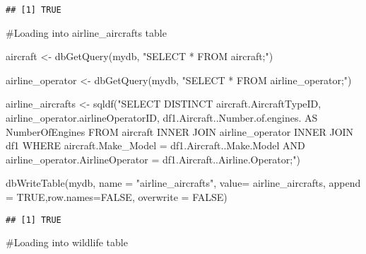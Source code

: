 \documentclass[
]{article}
\newenvironment{Shaded}{\begin{snugshade}}{\end{snugshade}}
\newcommand{\AttributeTok}[1]{\textcolor[rgb]{0.77,0.63,0.00}{#1}}
\newcommand{\CommentTok}[1]{\textcolor[rgb]{0.56,0.35,0.01}{\textit{#1}}}
\newcommand{\ConstantTok}[1]{\textcolor[rgb]{0.00,0.00,0.00}{#1}}
\newcommand{\FunctionTok}[1]{\textcolor[rgb]{0.00,0.00,0.00}{#1}}
\newcommand{\NormalTok}[1]{#1}
\newcommand{\OtherTok}[1]{\textcolor[rgb]{0.56,0.35,0.01}{#1}}
\newcommand{\StringTok}[1]{\textcolor[rgb]{0.31,0.60,0.02}{#1}}
\begin{document}
\begin{verbatim}
## [1] TRUE
\end{verbatim}

\#Loading into airline\_aircrafts table

\begin{Shaded}
\begin{Highlighting}[]
\NormalTok{aircraft }\OtherTok{\textless{}{-}} \FunctionTok{dbGetQuery}\NormalTok{(mydb, }\StringTok{"SELECT * FROM \textasciigrave{}aircraft\textasciigrave{};"}\NormalTok{)}

\NormalTok{airline\_operator }\OtherTok{\textless{}{-}} \FunctionTok{dbGetQuery}\NormalTok{(mydb, }\StringTok{"SELECT * FROM \textasciigrave{}airline\_operator\textasciigrave{};"}\NormalTok{)}

\NormalTok{airline\_aircrafts }\OtherTok{\textless{}{-}} \FunctionTok{sqldf}\NormalTok{(}\StringTok{"SELECT DISTINCT aircraft.AircraftTypeID, airline\_operator.airlineOperatorID, df1.\textasciigrave{}Aircraft..Number.of.engines.\textasciigrave{} AS \textasciigrave{}NumberOfEngines\textasciigrave{} }
\StringTok{                           FROM aircraft INNER JOIN airline\_operator INNER JOIN df1}
\StringTok{                           WHERE aircraft.\textasciigrave{}Make\_Model\textasciigrave{} = df1.\textasciigrave{}Aircraft..Make.Model\textasciigrave{} AND }
\StringTok{                           airline\_operator.AirlineOperator = df1.\textasciigrave{}Aircraft..Airline.Operator\textasciigrave{};"}\NormalTok{)}

\FunctionTok{dbWriteTable}\NormalTok{(mydb, }\AttributeTok{name =} \StringTok{"airline\_aircrafts"}\NormalTok{, }\AttributeTok{value=}\NormalTok{ airline\_aircrafts, }\AttributeTok{append =} \ConstantTok{TRUE}\NormalTok{,}\AttributeTok{row.names=}\ConstantTok{FALSE}\NormalTok{, }\AttributeTok{overwrite =} \ConstantTok{FALSE}\NormalTok{)}
\end{Highlighting}
\end{Shaded}

\begin{verbatim}
## [1] TRUE
\end{verbatim}

\#Loading into wildlife table

\begin{Shaded}
\end{Shaded}
\end{document}
